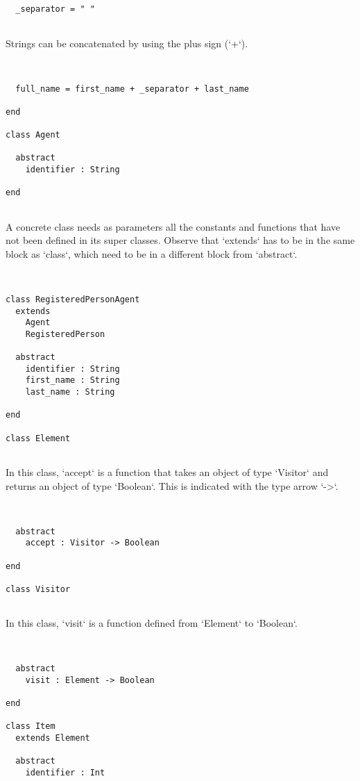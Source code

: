 \documentclass[12pt,a4paper]{article}
\begin{document}
\begin{lstlisting}


  _separator = " "


\end{lstlisting}

  Strings can be concatenated by using the plus sign (`+`).


\begin{lstlisting}


  full_name = first_name + _separator + last_name

end

class Agent

  abstract
    identifier : String

end


\end{lstlisting}

A concrete class needs as parameters all the constants and functions that have not been
 defined in its super classes. Observe that `extends` has to be in the same block as
 `class`, which need to be in a different block from `abstract`.


\begin{lstlisting}


class RegisteredPersonAgent
  extends
    Agent
    RegisteredPerson

  abstract
    identifier : String
    first_name : String
    last_name : String

end

class Element


\end{lstlisting}

  In this class, `accept` is a function that takes an object of type `Visitor` and returns
   an object of type `Boolean`. This is indicated with the type arrow `->`.


\begin{lstlisting}


  abstract
    accept : Visitor -> Boolean

end

class Visitor


\end{lstlisting}

  In this class, `visit` is a function defined from `Element` to `Boolean`.


\begin{lstlisting}


  abstract
    visit : Element -> Boolean

end

class Item
  extends Element

  abstract
    identifier : Int


\end{lstlisting}
\end{document}

